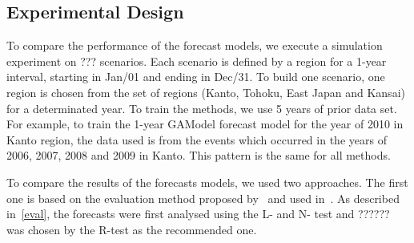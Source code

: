 



\subsection{Experimental Design}
To compare the performance of the forecast models, we execute a
simulation experiment on ??? scenarios. Each scenario is defined by a
region for a 1-year interval, starting in Jan/01 and ending in
Dec/31. To build one scenario, one region is chosen from the set of
regions (Kanto, Tohoku, East Japan and Kansai) for a determinated
year. To train the methods, we use 5 years of prior data set. For example,
to train the 1-year GAModel forecast model for the year of 2010 in Kanto region, the data used is from the events which occurred in the years of 2006, 2007, 2008 and 2009 in
Kanto. This pattern is the same for all methods.

To compare the results of the forecasts models, we used two approaches. The first
one is based on the evaluation method proposed
by~\cite{Schorlemmer2007} and used in~\cite{schorlemmer2010first}. As
described in~\ref{eval}, the forecasts were first analysed using the
L- and N- test and ??????  was chosen by the R-test as the recommended
one.

